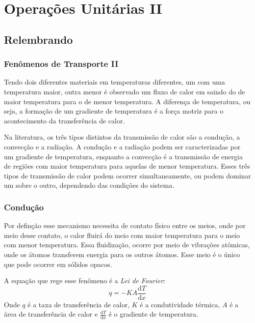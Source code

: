 \chapter{Operações Unitárias II}
\section{Relembrando}
\subsection{Fenômenos de Transporte II}
Tendo dois diferentes materiais em temperaturas diferentes, um com uma temperatura maior, outra
menor é observado um fluxo de calor em saindo do de maior temperatura para o de menor temperatura. A
diferença de temperatura, ou seja, a formação de um gradiente de temperatura é a força motriz para o
acontecimento da transferência de calor. \par

Na literatura, os três tipos distintos da transmissão de calor são a condução, a convecção e a
radiação. A condução e a radiação podem ser caracterizadas por um gradiente de temperatura, enquanto
a convecção é a transmissão de energia de regiões com maior temperatura para aquelas de menor
temperatura. Esses três tipos de transmissão de calor podem ocorrer simultaneamente, ou podem
dominar um sobre o outro, dependendo das condições do sistema. \par

\subsection{Condução}
Por definção esse mecanismo necessita de contato físico entre os meios, onde por meio desse contato,
o calor fluirá do meio com maior temperatura para o meio com menor temperatura. Essa fluidização,
ocorre por meio de vibrações atômicas, onde os átomos transferem energia para os outros átomos. Esse
meio é o único que pode ocorrer em sólidos opacos. \par

A equação que rege esse fenômeno é a \emph{Lei de Fourier}:
\begin{equation}\label{eq:fourier}
    q = - KA \frac{\mathrm{d}T}{\mathrm{d}x} 
\end{equation}
Onde $q$ é a taxa de transferência de calor, $K$ é a condutividade térmica, $A$ é a área de
transferência de calor e $\frac{\mathrm{d}T}{\mathrm{d}x}$ é o gradiente de temperatura. \par
